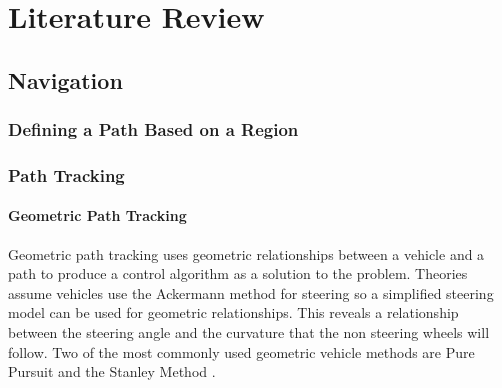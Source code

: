 \documentclass[main.tex]{subfiles}
\begin{document}
\chapter{Literature Review}

\section{Navigation}
\subsection{Defining a Path Based on a Region}
\textbf{\color{red}{JONO CAN YOU TALK ABOUT DIFFERENT METHODS DO DEFINE A PATH BASED ON A REGION HERE, or maybe we dont even need to mention it, put in detailed design?}}

\subsection{Path Tracking}
\subsubsection{Geometric Path Tracking}
Geometric path tracking uses geometric relationships between a vehicle and a path to produce a control algorithm as a solution to the problem. Theories assume vehicles use the Ackermann method for steering so a simplified steering model can be used for geometric relationships. This reveals a relationship between the steering angle and the curvature that the non steering wheels will follow. Two of the most commonly used geometric vehicle methods are Pure Pursuit and the Stanley Method \parencite{snider2009}.
\end{document}
